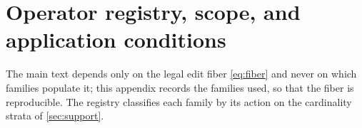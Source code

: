 %

\section{Operator registry, scope, and application conditions}
\label{app:operators}

The main text depends only on the legal edit fiber \eqref{eq:fiber} and never on which families populate it; this appendix records the families used, so that the fiber is reproducible.
The registry classifies each family by its action on the cardinality strata of \cref{sec:support}.

